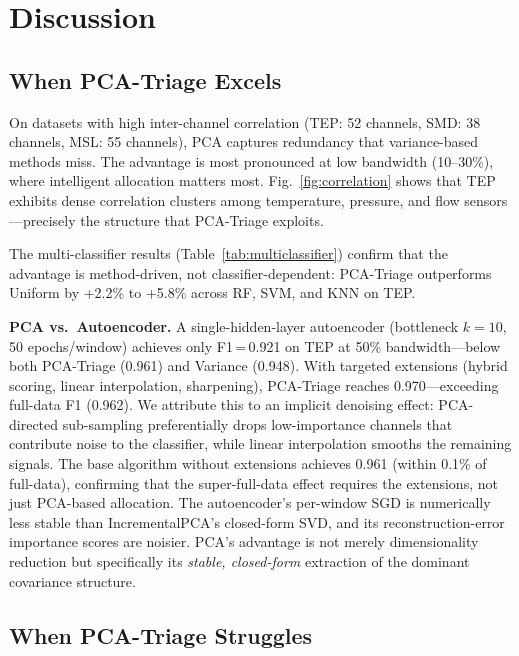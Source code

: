 \documentclass[journal]{IEEEtran}
\begin{document}
\section{Discussion}
\label{sec:discussion}

\subsection{When PCA-Triage Excels}

On datasets with high inter-channel correlation (TEP: 52 channels, SMD: 38 channels, MSL: 55 channels), PCA captures redundancy that variance-based methods miss. The advantage is most pronounced at low bandwidth (10--30\%), where intelligent allocation matters most. Fig.~\ref{fig:correlation} shows that TEP exhibits dense correlation clusters among temperature, pressure, and flow sensors---precisely the structure that PCA-Triage exploits.

The multi-classifier results (Table~\ref{tab:multiclassifier}) confirm that the advantage is method-driven, not classifier-dependent: PCA-Triage outperforms Uniform by +2.2\% to +5.8\% across RF, SVM, and KNN on TEP.

\textbf{PCA vs.\ Autoencoder.} A single-hidden-layer autoencoder (bottleneck $k{=}10$, 50 epochs/window) achieves only F1\,=\,0.921 on TEP at 50\% bandwidth---below both PCA-Triage (0.961) and Variance (0.948). With targeted extensions (hybrid scoring, linear interpolation, sharpening), PCA-Triage reaches 0.970---exceeding full-data F1 (0.962). We attribute this to an implicit denoising effect: PCA-directed sub-sampling preferentially drops low-importance channels that contribute noise to the classifier, while linear interpolation smooths the remaining signals. The base algorithm without extensions achieves 0.961 (within 0.1\% of full-data), confirming that the super-full-data effect requires the extensions, not just PCA-based allocation. The autoencoder's per-window SGD is numerically less stable than IncrementalPCA's closed-form SVD, and its reconstruction-error importance scores are noisier. PCA's advantage is not merely dimensionality reduction but specifically its \textit{stable, closed-form} extraction of the dominant covariance structure.

\subsection{When PCA-Triage Struggles}
\end{document}
